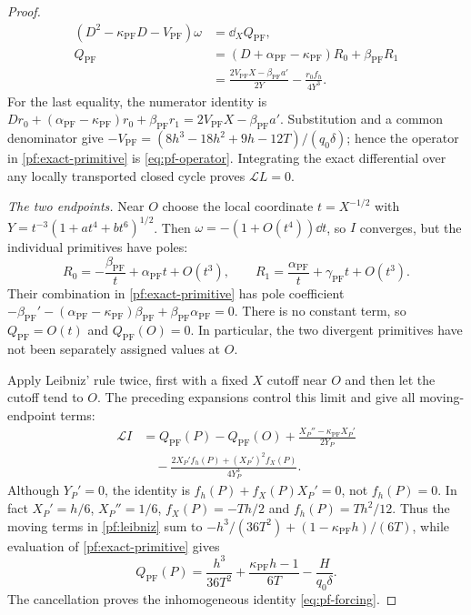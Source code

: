 \begin{proof}
\begin{equation}\label{pf:exact-primitive}
\begin{aligned}
(D^2-\kappa_{\mathrm{PF}}D-V_{\mathrm{PF}})\omega
&=\dd_XQ_{\mathrm{PF}},\\
Q_{\mathrm{PF}}
&=(D+\alpha_{\mathrm{PF}}-\kappa_{\mathrm{PF}})R_0
  +\beta_{\mathrm{PF}}R_1\\
&=\frac{2V_{\mathrm{PF}}X-\beta_{\mathrm{PF}}a'}{2Y}
  -\frac{r_0f_h}{4Y^3}.
\end{aligned}
\end{equation}
For the last equality, the numerator identity is
$Dr_0+(\alpha_{\mathrm{PF}}-\kappa_{\mathrm{PF}})r_0
+\beta_{\mathrm{PF}}r_1=2V_{\mathrm{PF}}X-\beta_{\mathrm{PF}}a'$.
Substitution and a common denominator give
$-V_{\mathrm{PF}}=(8h^3-18h^2+9h-12T)/(q_0\delta)$;
hence the operator in \eqref{pf:exact-primitive} is \eqref{eq:pf-operator}.
Integrating the exact differential over any locally transported closed
cycle proves $\mathcal L L=0$.

\emph{The two endpoints.}
Near $O$ choose the local coordinate $t=X^{-1/2}$ with
$Y=t^{-3}(1+at^4+bt^6)^{1/2}$.  Then
$\omega=-(1+O(t^4))\dd t$, so $I$ converges, but the individual primitives
have poles:
\[
R_0=-\frac{\beta_{\mathrm{PF}}}{t}
  +\alpha_{\mathrm{PF}}t+O(t^3),\qquad
R_1=\frac{\alpha_{\mathrm{PF}}}{t}
  +\gamma_{\mathrm{PF}}t+O(t^3).
\]
Their combination in \eqref{pf:exact-primitive} has pole coefficient
$-\beta_{\mathrm{PF}}'
-(\alpha_{\mathrm{PF}}-\kappa_{\mathrm{PF}})\beta_{\mathrm{PF}}
+\beta_{\mathrm{PF}}\alpha_{\mathrm{PF}}=0$.
There is no constant term, so $Q_{\mathrm{PF}}=O(t)$ and
$Q_{\mathrm{PF}}(O)=0$.  In particular, the two divergent primitives
have not been separately assigned values at $O$.

Apply Leibniz' rule twice, first with a fixed $X$ cutoff near $O$ and
then let the cutoff tend to $O$.  The preceding expansions control this
limit and give all moving-endpoint terms:
\begin{equation}\label{pf:leibniz}
\begin{aligned}
\mathcal L I&=Q_{\mathrm{PF}}(P)-Q_{\mathrm{PF}}(O)
+\frac{X_P''-\kappa_{\mathrm{PF}}X_P'}{2Y_P}
\\
&\hspace{1em}-\frac{2X_P'f_h(P)+(X_P')^2f_X(P)}{4Y_P^3}.
\end{aligned}
\end{equation}
Although $Y_P'=0$, the identity is
$f_h(P)+f_X(P)X_P'=0$, not $f_h(P)=0$.
In fact $X_P'=h/6$, $X_P''=1/6$, $f_X(P)=-Th/2$ and
$f_h(P)=Th^2/12$.  Thus the moving terms in \eqref{pf:leibniz} sum to
$-h^3/(36T^2)+(1-\kappa_{\mathrm{PF}}h)/(6T)$, while evaluation of
\eqref{pf:exact-primitive} gives
\[
Q_{\mathrm{PF}}(P)=\frac{h^3}{36T^2}
+\frac{\kappa_{\mathrm{PF}}h-1}{6T}-\frac{H}{q_0\delta}.
\]
The cancellation proves the inhomogeneous identity
\eqref{eq:pf-forcing}.


\end{proof}
